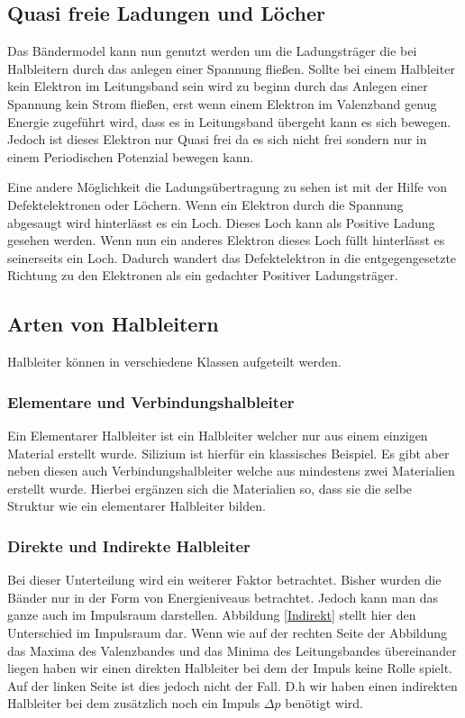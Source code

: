 \subsection{Quasi freie Ladungen und Löcher}
Das Bändermodel kann nun genutzt werden um die Ladungsträger die bei Halbleitern durch das anlegen einer Spannung fließen. Sollte bei einem Halbleiter kein Elektron im Leitungsband sein wird zu beginn durch das Anlegen einer Spannung kein Strom fließen, erst wenn einem Elektron im Valenzband genug Energie zugeführt wird, dass es in Leitungsband übergeht kann es sich bewegen. Jedoch ist dieses Elektron nur Quasi frei da es sich nicht frei sondern nur in einem Periodischen Potenzial bewegen kann.\par
Eine andere Möglichkeit die Ladungsübertragung zu sehen ist mit der Hilfe von Defektelektronen oder Löchern. Wenn ein Elektron durch die Spannung abgesaugt wird hinterlässt es ein Loch. Dieses Loch kann als Positive Ladung gesehen werden. Wenn nun ein anderes Elektron dieses Loch füllt hinterlässt es seinerseits ein Loch. Dadurch wandert das Defektelektron in die entgegengesetzte Richtung zu den Elektronen als ein gedachter Positiver Ladungsträger.
\subsection{Arten von Halbleitern}
Halbleiter können in verschiedene Klassen aufgeteilt werden.\par
\subsubsection{Elementare und Verbindungshalbleiter}
Ein Elementarer Halbleiter ist ein Halbleiter welcher nur aus einem einzigen Material erstellt wurde. Silizium ist hierfür ein klassisches Beispiel. Es gibt aber neben diesen auch Verbindungshalbleiter welche aus mindestens zwei Materialien erstellt wurde. Hierbei ergänzen sich die Materialien so, dass sie die selbe Struktur wie ein elementarer Halbleiter bilden.
\subsubsection{Direkte und Indirekte Halbleiter}
Bei dieser Unterteilung wird ein weiterer Faktor betrachtet. Bisher wurden die Bänder nur in der Form von Energieniveaus betrachtet. Jedoch kann man das ganze auch im Impulsraum darstellen. Abbildung \ref{Indirekt} stellt hier den Unterschied im Impulsraum dar. Wenn wie auf der rechten Seite der Abbildung das Maxima des Valenzbandes und das Minima des Leitungsbandes übereinander liegen haben wir einen direkten Halbleiter bei dem der Impuls keine Rolle spielt. Auf der linken Seite ist dies jedoch nicht der Fall. D.h wir haben einen indirekten Halbleiter bei dem zusätzlich noch ein Impuls $\Delta p$ benötigt wird.
